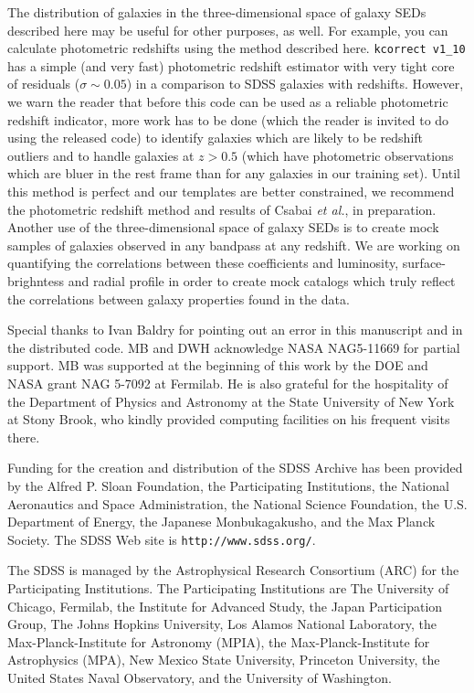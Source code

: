 \documentclass[10pt,preprint]{aastex}
\newcommand{\kversion}{{\tt v1\_10}}
\begin{document}
The distribution of galaxies in the three-dimensional space of galaxy
SEDs described here may be useful for other purposes, as well. For
example, you can calculate photometric redshifts using the method
described here. {\tt kcorrect \kversion} has a simple (and very fast)
photometric redshift estimator with very tight core of residuals
($\sigma \sim 0.05$) in a comparison to SDSS galaxies with redshifts.
However, we warn the reader that before this code can be used as a
reliable photometric redshift indicator, more work has to be done
(which the reader is invited to do using the released code) to
identify galaxies which are likely to be redshift outliers and to
handle galaxies at $z>0.5$ (which have photometric observations which
are bluer in the rest frame than for any galaxies in our training
set). Until this method is perfect and our templates are better
constrained, we recommend the photometric redshift method and results
of Csabai {\it et al.}, in preparation. Another use of the
three-dimensional space of galaxy SEDs is to create mock samples of
galaxies observed in any bandpass at any redshift. We are working on
quantifying the correlations between these coefficients and
luminosity, surface-brighntess and radial profile in order to create
mock catalogs which truly reflect the correlations between galaxy
properties found in the data.

\acknowledgments

Special thanks to Ivan Baldry for pointing out an error in this
manuscript and in the distributed code.  MB and DWH acknowledge NASA
NAG5-11669 for partial support.  MB was supported at the beginning of
this work by the DOE and NASA grant NAG 5-7092 at Fermilab. He is also
grateful for the hospitality of the Department of Physics and
Astronomy at the State University of New York at Stony Brook, who
kindly provided computing facilities on his frequent visits there.

Funding for the creation and distribution of the SDSS Archive has been
provided by the Alfred P. Sloan Foundation, the Participating
Institutions, the National Aeronautics and Space Administration, the
National Science Foundation, the U.S. Department of Energy, the
Japanese Monbukagakusho, and the Max Planck Society. The SDSS Web site
is {\tt http://www.sdss.org/}.

The SDSS is managed by the Astrophysical Research Consortium (ARC) for
the Participating Institutions. The Participating Institutions are The
University of Chicago, Fermilab, the Institute for Advanced Study, the
Japan Participation Group, The Johns Hopkins University, Los Alamos
National Laboratory, the Max-Planck-Institute for Astronomy (MPIA),
the Max-Planck-Institute for Astrophysics (MPA), New Mexico State
University, Princeton University, the United States Naval Observatory,
and the University of Washington.
 
\begin{thebibliography}{DUM}

\end{thebibliography}

\newpage

%


\end{document}
